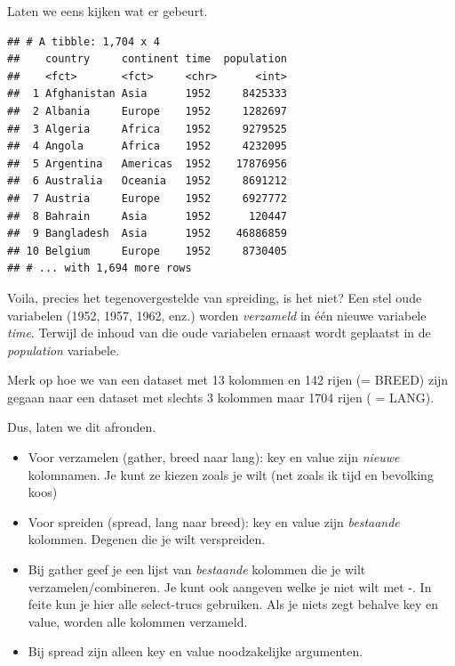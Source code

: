 \documentclass[]{tufte-book}
\newenvironment{Shaded}{}{}
\newcommand{\DataTypeTok}[1]{\textcolor[rgb]{0.56,0.13,0.00}{#1}}
\newcommand{\KeywordTok}[1]{\textcolor[rgb]{0.00,0.44,0.13}{\textbf{#1}}}
\newcommand{\NormalTok}[1]{#1}
\newcommand{\OperatorTok}[1]{\textcolor[rgb]{0.40,0.40,0.40}{#1}}
\newcommand{\StringTok}[1]{\textcolor[rgb]{0.25,0.44,0.63}{#1}}
\providecommand{\tightlist}{%
  \setlength{\itemsep}{0pt}\setlength{\parskip}{0pt}}
\begin{document}
Laten we eens kijken wat er gebeurt.

\begin{Shaded}
\end{Shaded}

\begin{verbatim}
## # A tibble: 1,704 x 4
##    country     continent time  population
##    <fct>       <fct>     <chr>      <int>
##  1 Afghanistan Asia      1952     8425333
##  2 Albania     Europe    1952     1282697
##  3 Algeria     Africa    1952     9279525
##  4 Angola      Africa    1952     4232095
##  5 Argentina   Americas  1952    17876956
##  6 Australia   Oceania   1952     8691212
##  7 Austria     Europe    1952     6927772
##  8 Bahrain     Asia      1952      120447
##  9 Bangladesh  Asia      1952    46886859
## 10 Belgium     Europe    1952     8730405
## # ... with 1,694 more rows
\end{verbatim}

Voila, precies het tegenovergestelde van spreiding, is het niet? Een stel oude variabelen (1952, 1957, 1962, enz.) worden \emph{verzameld} in één nieuwe variabele \emph{time}. Terwijl de inhoud van die oude variabelen ernaast wordt geplaatst in de \emph{population} variabele.

Merk op hoe we van een dataset met 13 kolommen en 142 rijen (= BREED) zijn gegaan naar een dataset met slechts 3 kolommen maar 1704 rijen ( = LANG).

Dus, laten we dit afronden.

\begin{itemize}
\tightlist
\item
  Voor verzamelen (gather, breed naar lang): key en value zijn \emph{nieuwe} kolomnamen. Je kunt ze kiezen zoals je wilt (net zoals ik tijd en bevolking koos)
\item
  Voor spreiden (spread, lang naar breed): key en value zijn \emph{bestaande} kolommen. Degenen die je wilt verspreiden.
\item
  Bij gather geef je een lijst van \emph{bestaande} kolommen die je wilt verzamelen/combineren. Je kunt ook aangeven welke je niet wilt met -. In feite kun je hier alle select-trucs gebruiken. Als je niets zegt behalve key en value, worden alle kolommen verzameld.
\item
  Bij spread zijn alleen key en value noodzakelijke argumenten.
\end{itemize}
\end{document}
